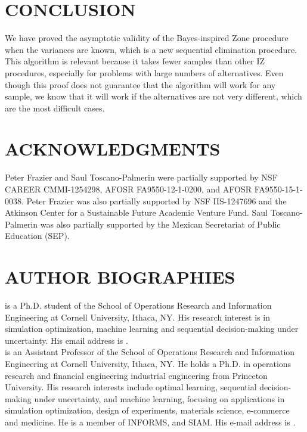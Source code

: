 \documentclass{wscpaperproc}
\theoremstyle{wsc}
\begin{document}
\section{CONCLUSION}

We have proved the asymptotic validity of the Bayes-inspired Zone
procedure \cite{Frazier:BIZ} when the variances are known, which is a
new sequential elimination procedure. This algorithm is relevant because
it takes fewer samples than other IZ procedures, especially for problems
with large numbers of alternatives. Even though this proof does not
guarantee that the algorithm will work for any sample, we know that
it will work if the alternatives are not very different, which are
the most difficult cases. 


\section*{ACKNOWLEDGMENTS}
Peter Frazier and Saul Toscano-Palmerin were partially supported by NSF CAREER CMMI-1254298, AFOSR FA9550-12-1-0200, and AFOSR FA9550-15-1-0038.
Peter Frazier was also partially supported by NSF IIS-1247696 and the Atkinson Center for a Sustainable Future Academic Venture Fund.
Saul Toscano-Palmerin was also partially supported by the Mexican Secretariat of Public Education (SEP).








\section*{AUTHOR BIOGRAPHIES}

 is a Ph.D. student of the School of Operations Research and Information Engineering at Cornell University, Ithaca, NY. His research interest is in simulation optimization, machine learning and sequential decision-making under uncertainty. His email address is . \\

 is an Assistant Professor of the School of Operations Research and Information Engineering at Cornell University, Ithaca, NY.  He holds a Ph.D. in operations research and financial engineering industrial engineering from Princeton University. His research interests include optimal learning, sequential decision-making under uncertainty, and machine learning, focusing on applications in simulation optimization, design of experiments, materials science, e-commerce and medicine. He is a member of INFORMS, and SIAM. His e-mail address is .\\
\end{document}
